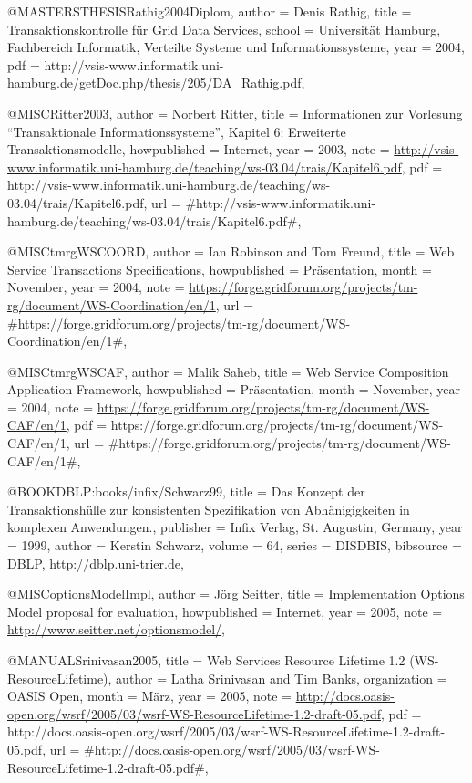 @MASTERSTHESIS{Rathig2004Diplom,
  author = {Denis Rathig},
  title = {{Transaktionskontrolle für Grid Data Services}},
  school = {Universität Hamburg, Fachbereich Informatik, Verteilte Systeme und
	Informationssysteme},
  year = {2004},
  pdf = {http://vsis-www.informatik.uni-hamburg.de/getDoc.php/thesis/205/DA_Rathig.pdf},
}

@MISC{Ritter2003,
  author = {Norbert Ritter},
  title = {{Informationen zur Vorlesung "`Transaktionale Informationssysteme"',
	Kapitel 6: Erweiterte Transaktionsmodelle}},
  howpublished = {Internet},
  year = {2003},
  note = {\url{http://vsis-www.informatik.uni-hamburg.de/teaching/ws-03.04/trais/Kapitel6.pdf}},
  pdf = {http://vsis-www.informatik.uni-hamburg.de/teaching/ws-03.04/trais/Kapitel6.pdf},
  url = {#http://vsis-www.informatik.uni-hamburg.de/teaching/ws-03.04/trais/Kapitel6.pdf#},
}

@MISC{tmrgWSCOORD,
  author = {Ian Robinson and Tom Freund},
  title = {{Web Service Transactions Specifications}},
  howpublished = {Präsentation},
  month = {November},
  year = {2004},
  note = {\url{https://forge.gridforum.org/projects/tm-rg/document/WS-Coordination/en/1}},
  url = {#https://forge.gridforum.org/projects/tm-rg/document/WS-Coordination/en/1#},
}

@MISC{tmrgWSCAF,
  author = {Malik Saheb},
  title = {{Web Service Composition Application Framework}},
  howpublished = {Präsentation},
  month = {November},
  year = {2004},
  note = {\url{https://forge.gridforum.org/projects/tm-rg/document/WS-CAF/en/1}},
  pdf = {https://forge.gridforum.org/projects/tm-rg/document/WS-CAF/en/1},
  url = {#https://forge.gridforum.org/projects/tm-rg/document/WS-CAF/en/1#},
}

@BOOK{DBLP:books/infix/Schwarz99,
  title = {{Das Konzept der Transaktionshülle zur konsistenten Spezifikation
	von Abhänigigkeiten in komplexen Anwendungen.}},
  publisher = {Infix Verlag, St. Augustin, Germany},
  year = {1999},
  author = {Kerstin Schwarz},
  volume = {64},
  series = {DISDBIS},
  bibsource = {DBLP, http://dblp.uni-trier.de},
}

@MISC{optionsModelImpl,
  author = {Jörg Seitter},
  title = {{Implementation Options Model proposal for evaluation}},
  howpublished = {Internet},
  year = {2005},
  note = {\url{http://www.seitter.net/optionsmodel/}},
}

@MANUAL{Srinivasan2005,
  title = {{Web Services Resource Lifetime 1.2 (WS-ResourceLifetime)}},
  author = {Latha Srinivasan and Tim Banks},
  organization = {OASIS Open},
  month = {März},
  year = {2005},
  note = {\url{http://docs.oasis-open.org/wsrf/2005/03/wsrf-WS-ResourceLifetime-1.2-draft-05.pdf}},
  pdf = {http://docs.oasis-open.org/wsrf/2005/03/wsrf-WS-ResourceLifetime-1.2-draft-05.pdf},
  url = {#http://docs.oasis-open.org/wsrf/2005/03/wsrf-WS-ResourceLifetime-1.2-draft-05.pdf#},
}


